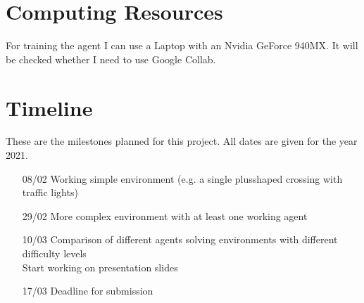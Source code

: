 \documentclass[11pt]{scrartcl}
\begin{document}
    \section{Computing Resources}
    For training the agent I can use a Laptop with an Nvidia GeForce 940MX.
    It will be checked whether I need to use Google Collab.


    \section{Timeline}
    These are the milestones planned for this project. All dates are given for the year 2021.
    \begin{itemize}[noitemsep]
        \item[08/02] Working simple environment (e.g. a single plusshaped crossing with traffic lights)
        \item[29/02] More complex environment with at least one working agent
        \item[10/03] Comparison of different agents solving environments with different difficulty levels \\
                     Start working on presentation slides
        \item[17/03] Deadline for submission
    \end{itemize}
\end{document}
